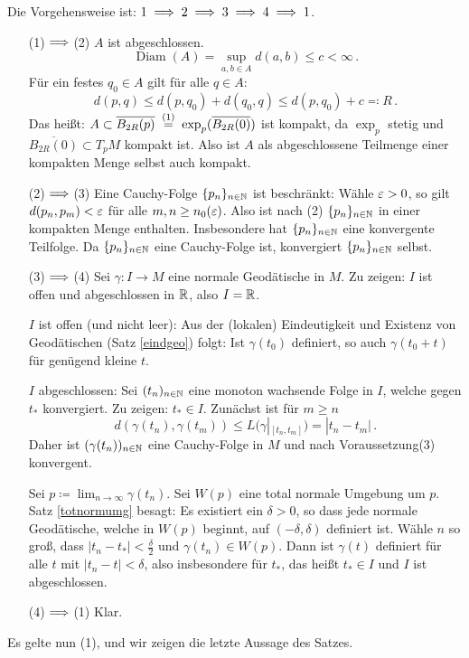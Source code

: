 \documentclass[a4paper,twoside,DIV15,BCOR12mm]{scrbook}
\renewcommand{\da}{\coloneqq}
\newcommand{\ad}{\eqqcolon}
\begin{document}
\begin{beweis}
Die Vorgehensweise ist: $1 \implies 2 \implies 3 \implies 4 \implies 1$.
\begin{enumerate}[(1)$\folgt$(2)]
\item[(1)$\folgt$(2)] $A$ ist abgeschlossen. \[\operatorname{Diam}(A) = \sup_{a,b\in A}d(a,b) \le c < \infty\,.\]
Für ein festes $q_0\in A$ gilt für alle $q\in A$: \[d(p,q) \le d(p,q_0) + d(q_0,q) \le d(p,q_0) + c \ad R\,.\]
Das heißt: $A \subset \overline{B_{2R}(p)} \gleichwegen{(1)} \exp_p(\overline{B_{2R}(0)})$ ist kompakt, da $\exp_p$ stetig und $\overline{B_{2R}(0)}\subset T_pM$ kompakt ist. Also ist $A$ als abgeschlossene Teilmenge einer kompakten Menge selbst auch kompakt.
\item[(2)$\folgt$(3)] 
Eine Cauchy-Folge $\{p_n\}_{n\in \mathbb{N}}$ ist beschränkt: Wähle $\varepsilon>0$, so gilt $d(p_n,p_m) < \varepsilon$ für alle $m,n \ge n_0(\varepsilon)$. Also ist nach (2) $\{p_n\}_{n\in \mathbb{N}}$ in einer kompakten Menge enthalten. Insbesondere hat $\{p_n\}_{n\in \mathbb{N}}$ eine konvergente Teilfolge. Da $\{p_n\}_{n\in \mathbb{N}}$ eine Cauchy-Folge ist, konvergiert $\{p_n\}_{n\in\mathbb{N}}$ selbst.
\item[(3)$\folgt$(4)] 
Sei $\gamma: I\to M$ eine normale Geodätische in $M$. Zu zeigen: $I$ ist offen und abgeschlossen in $\mathbb{R}$, also $I=\mathbb{R}$.

$I$ ist offen (und nicht leer): Aus der (lokalen) Eindeutigkeit und Existenz von Geodätischen (Satz \ref{eindgeo}) folgt: Ist $\gamma(t_0)$ definiert, so auch $\gamma(t_0+t)$ für genügend kleine $t$.

$I$ abgeschlossen: Sei $(t_n)_{n\in \mathbb{N}}$ eine monoton wachsende Folge in $I$, welche gegen $t_*$ konvergiert. Zu zeigen: $t_* \in I$. Zunächst ist für $m\ge n$ \[d(\gamma(t_n),\gamma(t_m)) \le L(\gamma|_{[t_n,t_m]}) = |t_n - t_m|\,.\] Daher ist $(\gamma(t_n))_{n\in\mathbb{N}}$ eine Cauchy-Folge in $M$ und nach Voraussetzung(3) konvergent.

Sei $p\da \lim_{n\to\infty} \gamma(t_n)$. Sei $W(p)$ eine total normale Umgebung um $p$. Satz \ref{totnormumg} besagt: Es existiert ein $\delta > 0$, so dass jede normale Geodätische, welche in $W(p)$ beginnt, auf $(-\delta,\delta)$ definiert ist. Wähle $n$ so groß, dass $|t_n - t_*|<\frac\delta2$ und $\gamma(t_n) \in W(p)$. Dann ist $\gamma(t)$ definiert für alle $t$ mit $|t_n - t| < \delta$, also insbesondere für $t_*$, das heißt $t_*\in I$ und $I$ ist abgeschlossen.
\item[(4)$\folgt$(1)] 
Klar.
\end{enumerate}
Es gelte nun (1), und wir zeigen die letzte Aussage des Satzes.


\end{beweis}
\end{document}
